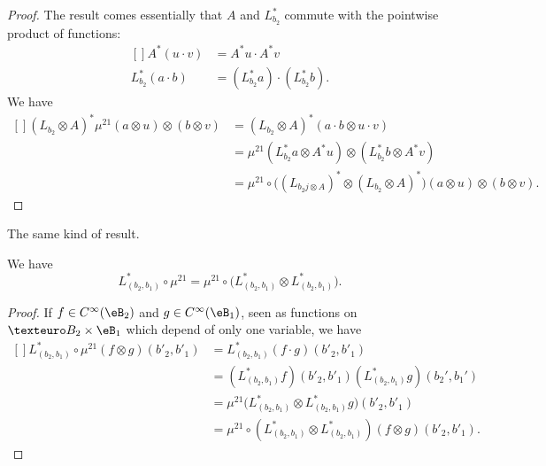 \begin{proof}
	The result comes essentially that $A$ and $L^*_{b_2}$ commute with the pointwise product of functions:
	\begin{equation}
		\begin{aligned}[]
			A^*(u\cdot v)&=A^*u\cdot A^*v\\
			L^*_{b_2}(a\cdot b)&=(L^*_{b_2}a)\cdot(L^*_{b_2}b).
		\end{aligned}
	\end{equation}
	We have
	\begin{equation}
		\begin{aligned}[]
			(L_{b_2}\otimes A)^*\mu^{21}(a\otimes u)\otimes(b\otimes v)
			&=(L_{b_2}\otimes A)^*(a\cdot b\otimes u\cdot v)\\
			&=\mu^{21}(L^*_{b_2}a\otimes A^*u)\otimes(L^*_{b_2}b\otimes A^*v)\\
			&=\mu^{21}\circ\Big( (L_{b_2j\otimes A})^*\otimes(L_{b_2}\otimes A)^* \Big)(a\otimes u)\otimes(b\otimes v).
		\end{aligned}
	\end{equation}
\end{proof}

The same kind of result.
\begin{lemma}		\label{Lem1607LmumuLotimes}
	We have
	\begin{equation}
		L^*_{(b_2,b_1)}\circ\mu^{21}=\mu^{21}\circ\big( L^*_{(b_2,b_1)}\otimes L^*_{(b_2,b_1)} \big).
	\end{equation}
\end{lemma}

\begin{proof}
	If $f\in C^{\infty}(\eB_2)$ and $g\in C^{\infty}(\eB_1)$, seen as functions on $€B_2\times\eB_1$ which depend of only one variable, we have
	\begin{equation}
		\begin{aligned}[]
			L^*_{(b_2,b_1)}\circ\mu^{21}(f\otimes g)(b'_2,b'_1)&=L^*_{(b_2,b_1)}(f\cdot g)(b'_2,b'_1)\\
			&=(L^*_{(b_2,b_1)}f)(b'_2,b'_1)(L^*_{(b_2,b_1)}g)(b_2',b_1')\\
			&=\mu^{21}\big( L^*_{(b_2,b_1)}\otimes L^*_{(b_2,b_1)} g \big)(b'_2,b'_1)\\
			&=\mu^{21}\circ(L^*_{(b_2,b_1)}\otimes L^*_{(b_2,b_1)})(f\otimes g)(b'_2,b'_1).
		\end{aligned}
	\end{equation}
\end{proof}


